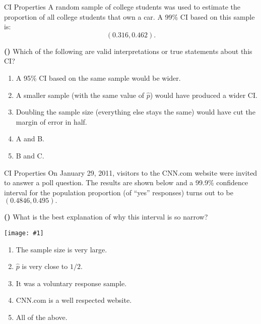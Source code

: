 \documentclass[13pt]{beamer}
\newcounter{count}
\newcommand{\question}{ \textbf{(\decimal{count})} \stepcounter{count}}
\newcommand{\pic}[2]{\hfill\texttt{[image: \#1]}\hspace*{\fill}}
\begin{document}
\begin{frame}{CI Properties}
A random sample of college students was used to estimate the proportion of all college students that own a car. A 99\% CI based on this sample is:
$$(0.316,0.462).$$

\question Which of the following are valid interpretations or true statements about this CI?

\begin{enumerate}[A]
   \item A 95\% CI based on the same sample would be wider.
   \item A smaller sample (with the same value of $\hat{p}$) would have produced a wider CI. %
   \item Doubling the sample size (everything else stays the same) would have cut the margin of error in half.
   \item A and B.
   \item B and C.
\end{enumerate}
\end{frame}

\begin{frame}{CI Properties}
On January 29, 2011, visitors to the CNN.com website were invited to answer a poll question. The results are shown below and a 99.9\% confidence interval for the population proportion (of “yes” responses) turns out to be 
$(0.4846,0.495).$
 
 \begin{multicols}{2}
\question What is the best explanation of why this interval is so narrow?

 \begin{center}
 \pic{cnnpoll.PNG}{.6}
 \end{center}
\end{multicols}

\begin{enumerate}[A]
   \item The sample size is very large.%
   \item $\hat{p}$ is very close to $1/2$.
   \item It was a voluntary response sample.
   \item CNN.com is a well respected website.
   \item All of the above.
\end{enumerate}
\end{frame}
\end{document}
